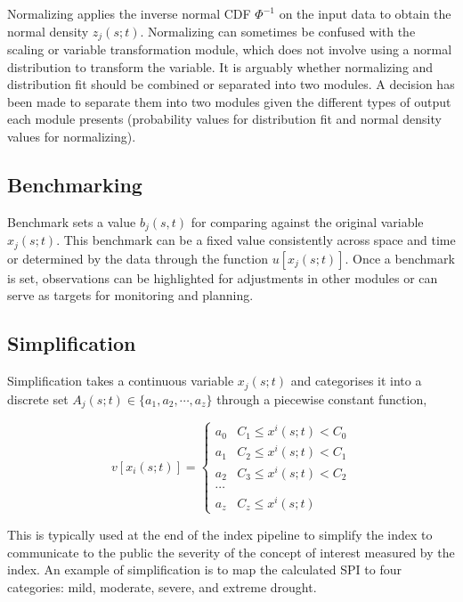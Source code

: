 \documentclass[
]{interact}
\begin{document}
Normalizing applies the inverse normal CDF \(\Phi^{-1}\) on the input
data to obtain the normal density \(z_{j}(s;t)\). Normalizing can
sometimes be confused with the scaling or variable transformation
module, which does not involve using a normal distribution to transform
the variable. It is arguably whether normalizing and distribution fit
should be combined or separated into two modules. A decision has been
made to separate them into two modules given the different types of
output each module presents (probability values for distribution fit and
normal density values for normalizing).

\hypertarget{benchmarking}{%
\subsection{Benchmarking}\label{benchmarking}}

Benchmark sets a value \(b_j(s,t)\) for comparing against the original
variable \(x_j(s;t)\). This benchmark can be a fixed value consistently
across space and time or determined by the data through the function
\(u[x_j(s;t)]\). Once a benchmark is set, observations can be
highlighted for adjustments in other modules or can serve as targets for
monitoring and planning.

\hypertarget{simplification}{%
\subsection{Simplification}\label{simplification}}

Simplification takes a continuous variable \(x_j(s;t)\) and categorises
it into a discrete set \(A_j(s;t) \in \{a_1, a_2, \cdots, a_z\}\)
through a piecewise constant function,

\begin{equation}
v[x_i(s;t)] = 
\begin{cases}
a_0 & C_1 \leq x^i(s; t) < C_0 \\
a_1 & C_2 \leq x^i(s; t) < C_1 \\
a_2 & C_3 \leq x^i(s; t) < C_2 \\
\cdots \\
a_z & C_z \leq x^i(s; t)
\end{cases}
\end{equation}

This is typically used at the end of the index pipeline to simplify the
index to communicate to the public the severity of the concept of
interest measured by the index. An example of simplification is to map
the calculated SPI to four categories: mild, moderate, severe, and
extreme drought.
\end{document}
